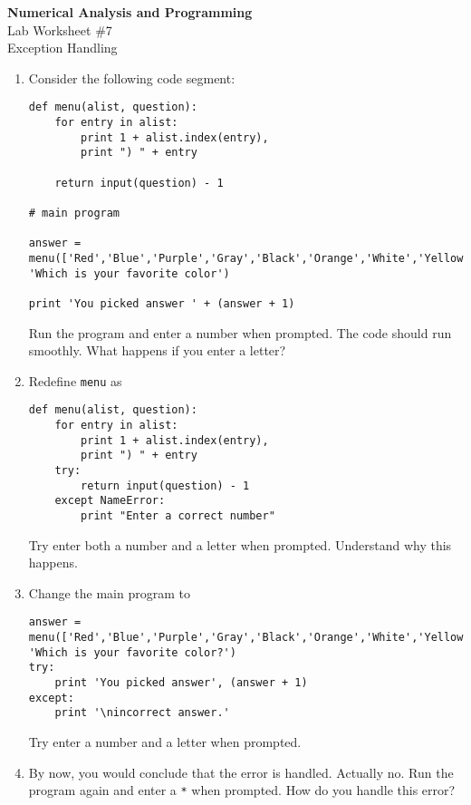 \documentclass[12pt]{article}
\begin{document}
\begin{center}
\Large
\textbf{Numerical Analysis and Programming}\\
\large
Lab Worksheet \#7\\
Exception Handling
\end{center}
\begin{enumerate}
\item Consider the following code segment:
\begin{scriptsize}
\begin{verbatim}
def menu(alist, question):
    for entry in alist:
        print 1 + alist.index(entry),
        print ") " + entry

    return input(question) - 1

# main program

answer = menu(['Red','Blue','Purple','Gray','Black','Orange','White','Yellow'],\
'Which is your favorite color')

print 'You picked answer ' + (answer + 1)
\end{verbatim}
\end{scriptsize}
Run the program and enter a number when prompted. The code should run smoothly. What happens if you enter a letter?  
\item Redefine \verb!menu! as 
\begin{scriptsize}
\begin{verbatim}
def menu(alist, question):
    for entry in alist:
        print 1 + alist.index(entry),
        print ") " + entry
    try:
        return input(question) - 1
    except NameError:
        print "Enter a correct number"
\end{verbatim}
\end{scriptsize}
Try enter both a number and a letter when prompted. Understand why this happens. 
\item Change the main program to 
\begin{scriptsize}
\begin{verbatim}
answer = menu(['Red','Blue','Purple','Gray','Black','Orange','White','Yellow'],\
'Which is your favorite color?')
try:
    print 'You picked answer', (answer + 1)
except:
    print '\nincorrect answer.'
\end{verbatim}
\end{scriptsize}
Try enter a number and a letter when prompted. 
\item By now, you would conclude that the error is handled. Actually no. Run the program again and enter a \verb!*! when prompted. How do you handle this error? 
\end{enumerate}
\end{document}

